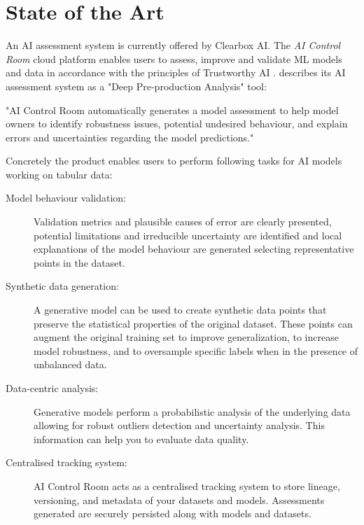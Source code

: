 \documentclass[11pt,a4paper,english]{scrreprt}
\begin{document}
\section{State of the Art}\label{section:state_of_the_art}
An AI assessment system is currently offered by Clearbox AI. The \textit{AI Control Room} cloud platform enables users to assess, improve and validate ML models and data in accordance with the principles of Trustworthy AI \parencite{clearbox_website,eu_trustworthy_ai}. \textcite{clearbox_website} describes its AI assessment system as a "Deep Pre‑production Analysis" tool:
\begin{displayquote}
    "AI Control Room automatically generates a model assessment to help model owners to identify robustness issues, potential undesired behaviour, and explain errors and uncertainties regarding the model predictions."
\end{displayquote}

Concretely the product enables users to perform following tasks for AI models working on tabular data:
\begin{description}
    \item [Model behaviour validation:] Validation metrics and plausible causes of error are clearly presented, potential limitations and irreducible uncertainty are identified and local explanations of the model behaviour are generated selecting representative points in the dataset.
    \item [Synthetic data generation:] A generative model can be used to create synthetic data points that preserve the statistical properties of the original dataset. These points can augment the original training set to improve generalization, to increase model robustness, and to oversample specific labels when in the presence of unbalanced data.
    \item [Data-centric analysis:] Generative models perform a probabilistic analysis of the underlying data allowing for robust outliers detection and uncertainty analysis. This information can help you to evaluate data quality.
    \item [Centralised tracking system:] AI Control Room acts as a centralised tracking system to store lineage, versioning, and metadata of your datasets and models. Assessments generated are securely persisted along with models and datasets.
\end{description}
\end{document}
